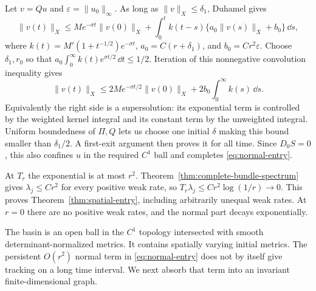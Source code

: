 Let $v=Qu$ and $\varepsilon=\|u_0\|_\infty$.
As long as $\|v\|_X\le\delta_1$, Duhamel gives
\begin{equation}\label{eq:normal-volterra}
 \|v(t)\|_X\le Me^{-\sigma t}\|v(0)\|_X+
  \int_0^t k(t-s)\{a_0\|v(s)\|_X+b_0\}\,\dd s,
\end{equation}
where $k(t)=M'(1+t^{-1/2})e^{-\sigma t}$,
$a_0=C(r+\delta_1)$, and $b_0=Cr^2\varepsilon$.
Choose $\delta_1,r_0$ so that
$a_0\int_0^\infty k(t)e^{\sigma t/2}\,\dd t\le1/2$.
Iteration of this nonnegative convolution inequality gives
\[
 \|v(t)\|_X\le2Me^{-\sigma t/2}\|v(0)\|_X
                              +2b_0\int_0^\infty k(s)\,\dd s.
\]
Equivalently the right side is a supersolution: its
exponential term is controlled by the weighted kernel
integral and its constant term by the unweighted integral.
Uniform boundedness of $\Pi,Q$ lets us choose one initial
$\delta$ making this bound smaller than $\delta_1/2$.
A first-exit argument then proves it for all time.
Since $D_0S=0$, this also confines $u$ in the required
$C^1$ ball and completes \eqref{eq:normal-entry}.

At $T_r$ the exponential is at most $r^2$.
Theorem~\ref{thm:complete-bundle-spectrum} gives
$\lambda_j\le Cr^2$ for every positive weak rate, so
$T_r\lambda_j\le Cr^2\log(1/r)\to0$.
This proves Theorem~\ref{thm:spatial-entry}, including
arbitrarily unequal weak rates. At $r=0$ there are no
positive weak rates, and the normal part decays exponentially.

The basin is an open ball in the $C^1$ topology intersected
with smooth determinant-normalized metrics. It contains
spatially varying initial metrics. The persistent $O(r^2)$
normal term in \eqref{eq:normal-entry} does not by itself
give tracking on a long time interval. We next absorb
that term into an invariant finite-dimensional graph.
